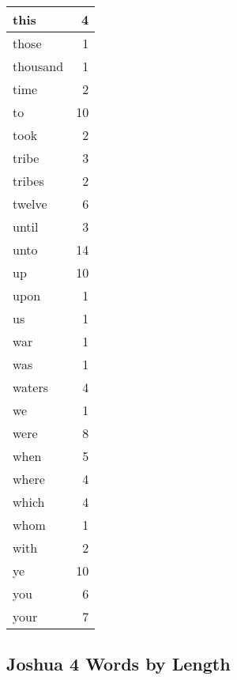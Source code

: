 \begin{center}
\begin{longtable}{l|r}
this & 4\\ \hline 
those & 1\\ \hline 
thousand & 1\\ \hline 
time & 2\\ \hline 
to & 10\\ \hline 
took & 2\\ \hline 
tribe & 3\\ \hline 
tribes & 2\\ \hline 
twelve & 6\\ \hline 
until & 3\\ \hline 
unto & 14\\ \hline 
up & 10\\ \hline 
upon & 1\\ \hline 
us & 1\\ \hline 
war & 1\\ \hline 
was & 1\\ \hline 
waters & 4\\ \hline 
we & 1\\ \hline 
were & 8\\ \hline 
when & 5\\ \hline 
where & 4\\ \hline 
which & 4\\ \hline 
whom & 1\\ \hline 
with & 2\\ \hline 
ye & 10\\ \hline 
you & 6\\ \hline 
your & 7\\ \hline 
\end{longtable}
\end{center}





\subsection{Joshua 4 Words by Length}


\normalsize
 
